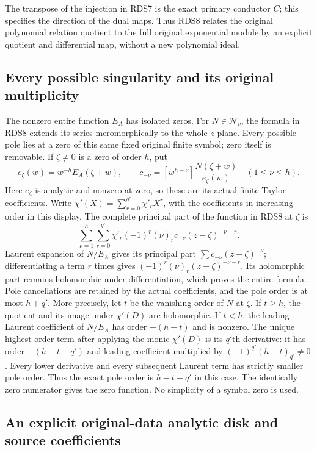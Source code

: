 \documentclass[11pt,a4paper]{article}
\begin{document}
The transpose of the injection in RDS7 is the exact primary
conductor $C$; this specifies the direction of the dual maps.
Thus RDS8 relates the original polynomial relation quotient
to the full original exponential module by an explicit
quotient and differential map, without a new polynomial ideal.

\subsection{Every possible singularity and its original multiplicity}

The nonzero entire function $E_A$ has isolated zeros. For
$N\in\mathscr N_v$, the formula in RDS8 extends its series
meromorphically to the whole $z$ plane. Every possible pole
lies at a zero of this same fixed original finite symbol;
zero itself is removable. If $\zeta\ne0$ is a zero of
order $h$, put
\[
 e_\zeta(w)=w^{-h}E_A(\zeta+w),\qquad
 c_{-\nu}= [w^{h-\nu}]\frac{N(\zeta+w)}{e_\zeta(w)}
                  \quad(1\le\nu\le h).
 \tag{RDS9}
\]
Here $e_\zeta$ is analytic and nonzero at zero, so these
are its actual finite Taylor coefficients. Write
$\chi'(X)=\sum_{r=0}^{q'}\chi'_rX^r$, with the coefficients
in increasing order in this display. The complete principal
part of the function in RDS8 at $\zeta$ is
\[
 \sum_{\nu=1}^h\sum_{r=0}^{q'}
       \chi'_r(-1)^r(\nu)_r c_{-\nu}
                        (z-\zeta)^{-\nu-r}.
 \tag{RDS10}
\]
Laurent expansion of $N/E_A$ gives its principal part
$\sum c_{-\nu}(z-\zeta)^{-\nu}$; differentiating a term
$r$ times gives $(-1)^r(\nu)_r(z-\zeta)^{-\nu-r}$.
Its holomorphic part remains holomorphic under differentiation,
which proves the entire formula. Pole cancellations are retained
by the actual coefficients, and the pole order is at most
$h+q'$. More precisely, let $t$ be the vanishing order of
$N$ at $\zeta$. If $t\ge h$, the quotient and its image
under $\chi'(D)$ are holomorphic. If $t<h$, the leading
Laurent coefficient of $N/E_A$ has order $-(h-t)$ and is
nonzero. The unique highest-order term after applying the
monic $\chi'(D)$ is its $q'$th derivative: it has order
$-(h-t+q')$ and leading coefficient multiplied by
$(-1)^{q'}(h-t)_{q'}\ne0$. Every lower derivative and
every subsequent Laurent term has strictly smaller pole
order. Thus the exact pole order is $h-t+q'$ in this case.
The identically zero numerator gives the zero function.
No simplicity of a symbol zero is used.

\subsection{An explicit original-data analytic disk and source coefficients}
\end{document}
